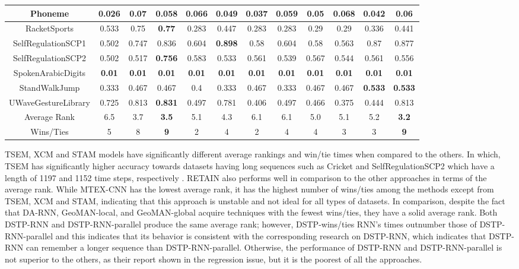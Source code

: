\documentclass{svproc}
\begin{document}
\begin{table}[ht!]
\begin{adjustbox}{width=1.3\textwidth}
\begin{tabular}{||c@{\hskip 0.1in}c@{\hskip 0.1in}c@{\hskip 0.1in}c@{\hskip 0.1in}c@{\hskip 0.1in}c@{\hskip 0.1in}c@{\hskip 0.1in}c@{\hskip 0.1in}c@{\hskip 0.1in}c@{\hskip 0.1in}c@{\hskip 0.1in}c||}
    \hline
    Phoneme &  0.026 & \textbf{0.07} & 0.058&0.066 & 0.049 & 0.037 & 0.059 & 0.05 & 0.068 & 0.042 & 0.06 \\ 
    \hline
    RacketSports &  0.533 & 0.75 &\textbf{0.77}& 0.283 & 0.447 & 0.283 & 0.283 & 0.29 & 0.29 & 0.336 & 0.441 \\  
    \hline
    SelfRegulationSCP1 &  0.502 & 0.747 &0.836& 0.604 & \textbf{0.898} & 0.58 & 0.604 & 0.58 & 0.563 & 0.87 & 0.877 \\  
    \hline
    SelfRegulationSCP2 &  0.502 & 0.517 &\textbf{0.756}& 0.583 & 0.533 & 0.561 & 0.539 & 0.567 & 0.544 & 0.561 & 0.556 \\ 
    \hline
    SpokenArabicDigits &  \textbf{0.01} & \textbf{0.01} &\textbf{0.01}& \textbf{0.01} & \textbf{0.01} & \textbf{0.01} & \textbf{0.01} & \textbf{0.01} & \textbf{0.01} & \textbf{0.01} & \textbf{0.01} \\ 
    \hline
    StandWalkJump &  0.333 & 0.467 &0.467& 0.4 & 0.333 & 0.467 & 0.333 & 0.467 & 0.467 & \textbf{0.533} & \textbf{0.533} \\ 
    \hline
    UWaveGestureLibrary&  0.725 & 0.813 &\textbf{0.831}& 0.497 & 0.781 & 0.406 & 0.497 & 0.466 & 0.375 & 0.444 & 0.813 \\  
    \hline
    \hline
    Average Rank & 6.5 & 3.7 & \textbf{3.5}& 5.1 & 4.3 & 6.1 & 6.1 & 5.0 & 5.1 & 5.2 & \textbf{3.2} \\
    \hline
    Wins/Ties &  5 & 8 & \textbf{9} & 2 & 4 & 2 & 4 & 4 & 3 & 3 & \textbf{9} \\[1ex]
    \hline
    \end{tabular}
    \end{adjustbox}
    \end{table}
TSEM, XCM and STAM models have significantly different average rankings and win/tie times when compared to the others. In which, TSEM has significantly higher accuracy towards datasets having long sequences such as Cricket and SelfRegulationSCP2 which have a length of 1197 and 1152 time steps, respectively \cite{bagnall2018uea}. RETAIN also performs well in comparison to the other approaches in terms of the average rank. While MTEX-CNN has the lowest average rank, it has the highest number of wins/ties among the methods except from TSEM, XCM and STAM, indicating that this approach is unstable and not ideal for all types of datasets. In comparison, despite the fact that DA-RNN, GeoMAN-local, and GeoMAN-global acquire techniques with the fewest wins/ties, they have a solid average rank. Both DSTP-RNN and DSTP-RNN-parallel produce the same average rank; however, DSTP-wins/ties RNN's times outnumber those of DSTP-RNN-parallel and this indicates that its behavior is consistent with the corresponding research on DSTP-RNN, which indicates that DSTP-RNN can remember a longer sequence than DSTP-RNN-parallel. Otherwise, the performance of DSTP-RNN and DSTP-RNN-parallel is not superior to the others, as their report shown in the regression issue, but it is the poorest of all the approaches. \\
\end{document}
